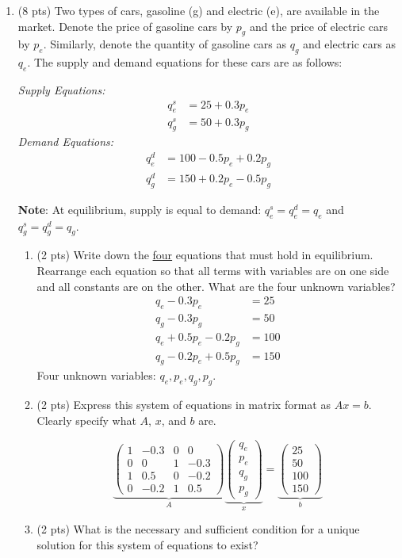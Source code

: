 \documentclass{./../../Latex/tests}
\begin{document}
\begin{enumerate}
\newpage
\item (8 pts) Two types of cars, gasoline (g) and electric (e), are available in the market. Denote the price of gasoline cars by \(p_g\) and the price of electric cars by \(p_e\). Similarly, denote the quantity of gasoline cars as \(q_g\) and electric cars as \(q_e\). The supply and demand equations for these cars are as follows:

\textit{Supply Equations:}
\begin{align*}
q^s_e &= 25 + 0.3p_e \\
q^s_g &= 50 + 0.3p_g
\end{align*}
\textit{Demand Equations:}
\begin{align*}
q^d_e &= 100 - 0.5p_e + 0.2p_g \\
q^d_g &= 150 + 0.2p_e - 0.5p_g
\end{align*}

\textbf{Note}: At equilibrium, supply is equal to demand: \(q^s_e = q^d_e = q_e\) and \(q^s_g = q^d_g = q_g\).

\begin{enumerate}
\item (2 pts) Write down the \underline{four} equations that must hold in equilibrium. Rearrange each equation so that all terms with variables are on one side and all constants are on the other. What are the four unknown variables?
\begin{align}
q_e-0.3p_e &= 25  \\
q_g - 0.3p_g &= 50  \\
q_e + 0.5p_e - 0.2p_g &= 100  \\
q_g - 0.2p_e + 0.5p_g &= 150 
\end{align}
Four unknown variables: $q_e, p_e, q_g, p_g$. \\
\item (2 pts) Express this system of equations in matrix format as \(Ax = b\). Clearly specify what \(A\), \(x\), and \(b\) are.

\[
\underbrace{\begin{pmatrix}
1 & -0.3 & 0 & 0 \\
0 & 0 & 1 & -0.3 \\
1 & 0.5 & 0 & -0.2 \\
0 & -0.2 & 1 & 0.5
\end{pmatrix}}_{A} 
\underbrace{\begin{pmatrix}
q_e \\
p_e \\
q_g \\
p_g
\end{pmatrix}}_{x}
=
\underbrace{\begin{pmatrix}
25 \\
50 \\
100 \\
150
\end{pmatrix}}_{b}
\]
\item (2 pts) What is the necessary and sufficient condition for a unique solution for this system of equations to exist? 


\end{enumerate}
\end{enumerate}
\end{document}
